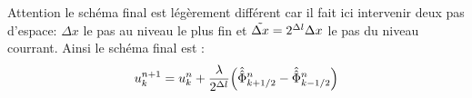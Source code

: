             Attention le schéma final est légèrement différent car il fait ici intervenir deux pas d'espace: $\Delta x$ le pas au niveau le plus fin
            et $\Tilde {\Delta x} = 2^{\Delta l} \Delta x$ le pas du niveau courrant. Ainsi le schéma final est :
            \begin{align}
                {u}^{n+1}_k = {u}^n_k + \frac{\lambda}{2^{\Delta l}} \Bigl( \hat{\hat{\Phi}}^n_{k+1/2} - \hat{\hat{\Phi}}^n_{k-1/2} \Bigr)
            \end{align}